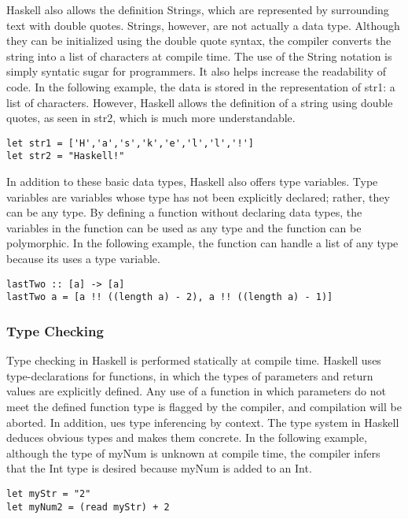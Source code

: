 \documentclass[titlepage,12pt]{article}
\begin{document}
Haskell also allows the definition Strings, which are represented by surrounding text with double quotes. Strings, however, are not actually a data type. Although they can be initialized using the double quote syntax, the compiler converts the string into a list of characters at compile time. The use of the String notation is simply syntatic sugar for programmers. It also helps increase the readability of code. In the following example, the data is stored in the representation of str1: a list of characters. However, Haskell allows the definition of a string using double quotes, as seen in str2, which is much more understandable.

\begin{verbatim}
let str1 = ['H','a','s','k','e','l','l','!']
let str2 = "Haskell!"
\end{verbatim}

In addition to these basic data types, Haskell also offers type variables. Type variables are variables whose type has not been explicitly declared; rather, they can be any type. By defining a function without declaring data types, the variables in the function can be used as any type and the function can be polymorphic. In the following example, the function can handle a list of any type because its uses a type variable. 

\begin{verbatim}
lastTwo :: [a] -> [a]
lastTwo a = [a !! ((length a) - 2), a !! ((length a) - 1)]
\end{verbatim}

\subsubsection{Type Checking}
Type checking in Haskell is performed statically at compile time. Haskell uses type-declarations for functions, in which the types of parameters and return values are explicitly defined. Any use of a function in which parameters do not meet the defined function type is flagged by the compiler, and compilation will be aborted. In addition, ues type inferencing by context. The type system in Haskell deduces obvious types and makes them concrete. In the following example, although the type of myNum is unknown at compile time, the compiler infers that the Int type is desired because myNum is added to an Int. 

\begin{verbatim}
let myStr = "2" 
let myNum2 = (read myStr) + 2
\end{verbatim}
\end{document}
